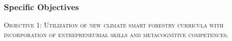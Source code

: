 \documentclass[
  11pt,
]{article}
\begin{document}
\hypertarget{specific-objectives}{%
\subsubsection{Specific Objectives}\label{specific-objectives}}

\begin{tcolorbox}

\textsc{Objective 1: Utilization of new climate smart forestry curricula with incorporation of entrepreneurial skills and metacognitive competences.}

\end{tcolorbox}

\providecommand{\docline}[3]{\noalign{\global\setlength{\arrayrulewidth}{#1}}\arrayrulecolor[HTML]{#2}\cline{#3}}

\setlength{\tabcolsep}{2pt}

\renewcommand*{\arraystretch}{1.5}
\end{document}
